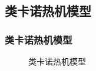 \documentclass{beamer}
\begin{document}
\subsection{类卡诺热机模型}
\begin{frame}
\frametitle{类卡诺热机模型}
\begin{figure}
    \centering
    \def\svgwidth{0.6\columnwidth}
    
    \caption{类卡诺热机模型}
    \label{p3.1}
\end{figure}
\end{frame}

%             
\end{document}
